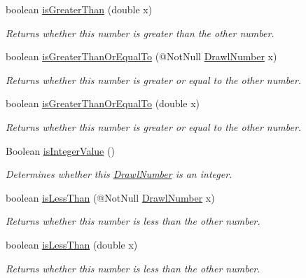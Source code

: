 \begin{DoxyCompactItemize}
boolean \hyperlink{classcom_1_1aarrelaakso_1_1drawl_1_1_drawl_number_a3c7176bcb037455fc1d9fd3b1f279916}{is\+Greater\+Than} (double x)
\begin{DoxyCompactList}\small\item\em Returns whether this number is greater than the other number. \end{DoxyCompactList}\item 
boolean \hyperlink{classcom_1_1aarrelaakso_1_1drawl_1_1_drawl_number_a6d84deaa088ce225fd8d6d000d1cafa0}{is\+Greater\+Than\+Or\+Equal\+To} (@Not\+Null \hyperlink{classcom_1_1aarrelaakso_1_1drawl_1_1_drawl_number}{Drawl\+Number} x)
\begin{DoxyCompactList}\small\item\em Returns whether this number is greater or equal to the other number. \end{DoxyCompactList}\item 
boolean \hyperlink{classcom_1_1aarrelaakso_1_1drawl_1_1_drawl_number_a2099cd81e0f9834548f8aea7814e9251}{is\+Greater\+Than\+Or\+Equal\+To} (double x)
\begin{DoxyCompactList}\small\item\em Returns whether this number is greater or equal to the other number. \end{DoxyCompactList}\item 
Boolean \hyperlink{classcom_1_1aarrelaakso_1_1drawl_1_1_drawl_number_a5f25d5df1753f8cb2a5853437156894a}{is\+Integer\+Value} ()
\begin{DoxyCompactList}\small\item\em Determines whether this \hyperlink{classcom_1_1aarrelaakso_1_1drawl_1_1_drawl_number}{Drawl\+Number} is an integer. \end{DoxyCompactList}\item 
boolean \hyperlink{classcom_1_1aarrelaakso_1_1drawl_1_1_drawl_number_adf18ede8f8565437ce262f4e9165a622}{is\+Less\+Than} (@Not\+Null \hyperlink{classcom_1_1aarrelaakso_1_1drawl_1_1_drawl_number}{Drawl\+Number} x)
\begin{DoxyCompactList}\small\item\em Returns whether this number is less than the other number. \end{DoxyCompactList}\item 
boolean \hyperlink{classcom_1_1aarrelaakso_1_1drawl_1_1_drawl_number_ae2e4d5bbd915221f90dc802e22630809}{is\+Less\+Than} (double x)
\begin{DoxyCompactList}\small\item\em Returns whether this number is less than the other number. \end{DoxyCompactList}\item 

\end{DoxyCompactItemize}
